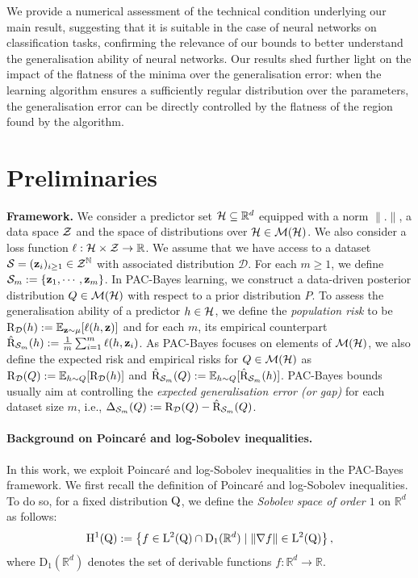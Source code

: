 We provide a numerical assessment of the technical condition underlying our main result, suggesting that it is suitable in the case of neural networks on classification tasks, confirming the relevance of our bounds to better understand the generalisation ability of neural networks.
Our results shed further light on the impact of the flatness of the minima over the generalisation error: when the learning algorithm ensures a sufficiently regular distribution over the parameters, the generalisation error can be directly controlled by the flatness of the region found by the algorithm.  

\section{Preliminaries}

\textbf{Framework.}
We consider a predictor set $\mathcal{H}\subseteq \mathbb{R}^d$ equipped with a norm $\|.\|$, a data space $\mathcal{Z}$ and the space of distributions over $\mathcal{H}\in\mathcal{M}(\mathcal{H})$.
We also consider a loss function $\ell : \mathcal{H}\times \mathcal{Z} \rightarrow \mathbb{R}$. 
We assume that we have access to a \iid dataset $\mathcal{S}=(\mathbf{z}_i)_{i\geq 1}\in\mathcal{Z}^{\mathbb{N}}$  with associated distribution $\mathcal{D}$. For each $m\geq 1$, we define $\mathcal{S}_m:= \{\mathbf{z}_1,\cdots,\mathbf{z}_m\}$.
In PAC-Bayes learning, we construct a data-driven posterior distribution $Q\in\mathcal{M}(\mathcal{H})$ with respect to a prior distribution $P$. 
To assess the generalisation ability of a predictor $h\in\mathcal{H}$, we define  the \emph{population risk} to be $\text{R}_{\mathcal{D}} (h) := \operatorname*{\mathbb{E}}_{\mathbf{z}\sim \mu}[\ell(h,\mathbf{z})]$ and for each $m$, its empirical counterpart $\hat{\text{R}}_{\mathcal{S}_m} (h) := \frac{1}{m}\sum_{i=1}^{m} \ell(h,\mathbf{z}_{i})$. As PAC-Bayes focuses on elements of $\mathcal{M}(\mathcal{H})$, we also define the expected risk and empirical risks for $Q\in\mathcal{M}(\mathcal{H})$ as $\text{R}_{\mathcal{D}}(Q):= \operatorname*{\mathbb{E}}_{h\sim Q}[ \text{R}_{\mathcal{D}}(h)]$ and $\hat{\text{R}}_{\mathcal{S}_m}(Q):= \operatorname*{\mathbb{E}}_{h\sim Q}[ \hat{\text{R}}_{\mathcal{S}_m}(h)]$.
PAC-Bayes bounds usually aim at controlling the \emph{expected generalisation error (or gap)} for each dataset size $m$, i.e.,  $\Delta_{\mathcal{S}_m}(Q):=
\text{R}_{\mathcal{D}}(Q) - \hat{\text{R}}_{\mathcal{S}_m}(Q)$.

\paragraph{Background on Poincaré and log-Sobolev inequalities.} In this work, we exploit Poincaré and log-Sobolev inequalities in the PAC-Bayes framework.
We first recall the definition of Poincaré and log-Sobolev inequalities.
To do so, for a fixed distribution $\mathrm{Q}$, we define the \emph{Sobolev space of order $1$} on $\mathbb{R}^d$ as follows:
\[ \mathrm{H}^{1}(\mathrm{Q}) := \left\{ f\in \mathrm{L}^2(\mathrm{Q})\cap \mathrm{D}_1(\mathbb{R}^d)\mid \|\nabla f\|\in \mathrm{L}^2(\mathrm{Q}) \right\}, \] 
where $\mathrm{D}_1(\mathbb{R}^d)$ denotes the set of derivable functions $f : \mathbb{R}^d \to \mathbb{R}$. 

